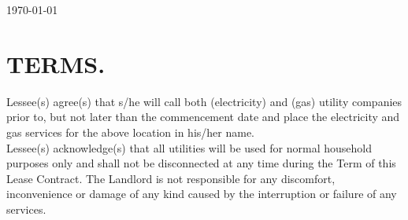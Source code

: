 \documentclass[9pt]{article}
\begin{document}

	\begin{center}
		\centering {}
	\end{center}
	\hfill \today

	\vspace{0.5cm}
	\tenantinfo{}{}

	\section{TERMS.}

	Lessee(s) agree(s) that s/he will call both  (electricity) and  (gas) utility companies prior to, but not later than the commencement date \DateBox{\Commencement} and place the electricity and gas services for the above location in his/her name.\\
	
	Lessee(s) acknowledge(s) that all utilities will be used for normal household purposes only and shall not be disconnected at any time during the Term of this Lease Contract. The Landlord is not responsible for any discomfort, inconvenience or damage of any kind caused by the interruption or failure of any services.

	
\end{document}
